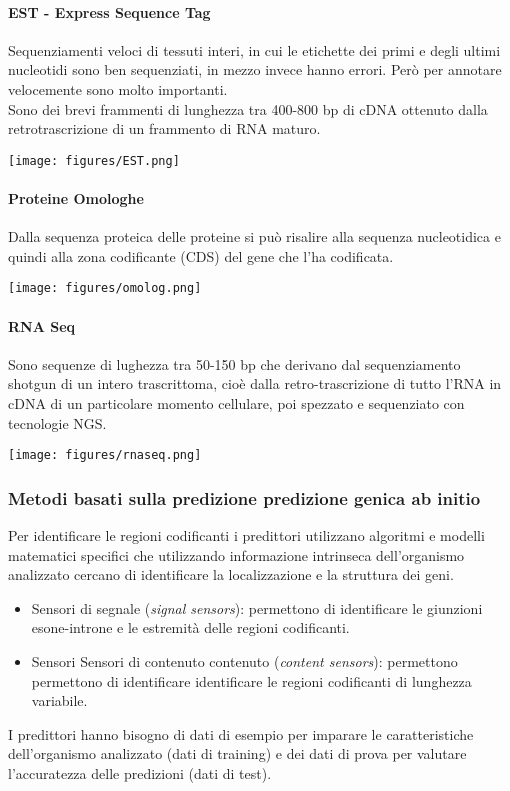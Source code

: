 \documentclass{article}
\begin{document}
\paragraph{EST - Express Sequence Tag}
Sequenziamenti veloci di tessuti interi, in cui le etichette dei primi e degli ultimi nucleotidi sono ben sequenziati, in mezzo invece hanno errori. Però per annotare velocemente sono molto importanti.\\
Sono dei brevi frammenti di lunghezza tra 400-800 bp di cDNA
ottenuto dalla retrotrascrizione di un frammento di RNA maturo.
\begin{center}
    \texttt{[image: figures/EST.png]}
\end{center}
\paragraph{Proteine Omologhe}
Dalla sequenza proteica delle proteine si può risalire alla
sequenza nucleotidica e quindi alla zona codificante (CDS) del
gene che l’ha codificata.
\begin{center}
    \texttt{[image: figures/omolog.png]}
\end{center}
\paragraph{RNA Seq}
Sono sequenze di lughezza tra 50-150 bp che derivano dal sequenziamento shotgun di un
intero trascrittoma, cioè dalla retro-trascrizione di tutto l’RNA in cDNA di un particolare
momento cellulare, poi spezzato e sequenziato con tecnologie NGS.
\begin{center}
    \texttt{[image: figures/rnaseq.png]}
\end{center}
\subsubsection{Metodi basati sulla predizione predizione genica ab initio}
Per identificare le regioni codificanti i predittori utilizzano algoritmi e modelli
matematici specifici che utilizzando informazione intrinseca dell’organismo
analizzato cercano di identificare la localizzazione e la struttura dei geni.
\begin{itemize}
    \item Sensori di segnale (\textit{signal sensors}): permettono di identificare le giunzioni
    esone-introne e le estremità delle regioni codificanti.
    \item Sensori Sensori di contenuto contenuto (\textit{content sensors}): permettono permettono di identificare identificare le
    regioni codificanti di lunghezza variabile.
\end{itemize}
I predittori hanno bisogno di dati di esempio per imparare le caratteristiche
dell’organismo analizzato (dati di training) e dei dati di prova per valutare
l’accuratezza delle predizioni (dati di test).
\end{document}
